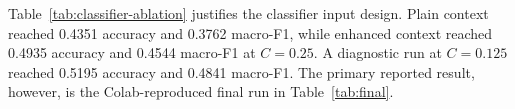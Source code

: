 \documentclass[11pt]{article}
\begin{document}
Table~\ref{tab:classifier-ablation} justifies the classifier input design.
Plain context reached 0.4351 accuracy and 0.3762 macro-F1, while enhanced
context reached 0.4935 accuracy and 0.4544 macro-F1 at $C=0.25$.  A diagnostic
run at $C=0.125$ reached 0.5195 accuracy and 0.4841 macro-F1.  The primary
reported result, however, is the Colab-reproduced final run in
Table~\ref{tab:final}.

\FloatBarrier


\end{document}
